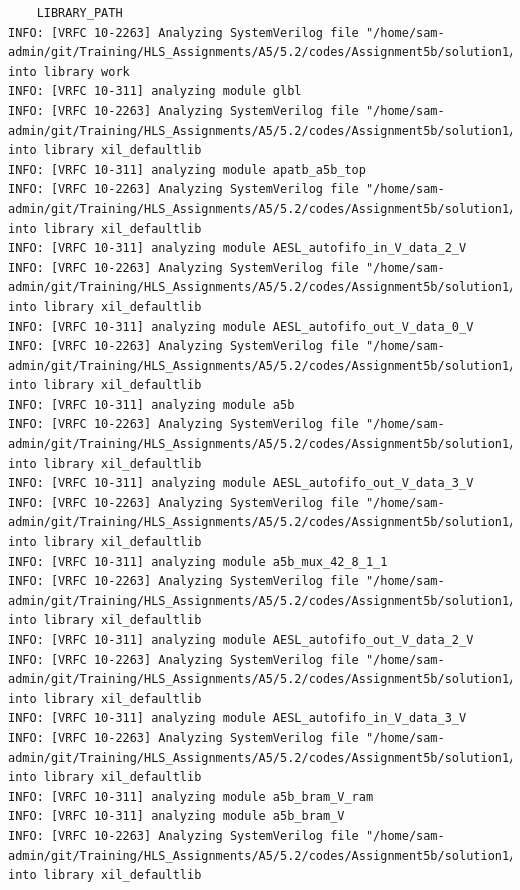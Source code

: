 \documentclass{article}
\begin{document}
\begin{lstlisting}
    LIBRARY_PATH
INFO: [VRFC 10-2263] Analyzing SystemVerilog file "/home/sam-admin/git/Training/HLS_Assignments/A5/5.2/codes/Assignment5b/solution1/sim/verilog/glbl.v" into library work
INFO: [VRFC 10-311] analyzing module glbl
INFO: [VRFC 10-2263] Analyzing SystemVerilog file "/home/sam-admin/git/Training/HLS_Assignments/A5/5.2/codes/Assignment5b/solution1/sim/verilog/a5b.autotb.v" into library xil_defaultlib
INFO: [VRFC 10-311] analyzing module apatb_a5b_top
INFO: [VRFC 10-2263] Analyzing SystemVerilog file "/home/sam-admin/git/Training/HLS_Assignments/A5/5.2/codes/Assignment5b/solution1/sim/verilog/AESL_autofifo_in_V_data_2_V.v" into library xil_defaultlib
INFO: [VRFC 10-311] analyzing module AESL_autofifo_in_V_data_2_V
INFO: [VRFC 10-2263] Analyzing SystemVerilog file "/home/sam-admin/git/Training/HLS_Assignments/A5/5.2/codes/Assignment5b/solution1/sim/verilog/AESL_autofifo_out_V_data_0_V.v" into library xil_defaultlib
INFO: [VRFC 10-311] analyzing module AESL_autofifo_out_V_data_0_V
INFO: [VRFC 10-2263] Analyzing SystemVerilog file "/home/sam-admin/git/Training/HLS_Assignments/A5/5.2/codes/Assignment5b/solution1/sim/verilog/a5b.v" into library xil_defaultlib
INFO: [VRFC 10-311] analyzing module a5b
INFO: [VRFC 10-2263] Analyzing SystemVerilog file "/home/sam-admin/git/Training/HLS_Assignments/A5/5.2/codes/Assignment5b/solution1/sim/verilog/AESL_autofifo_out_V_data_3_V.v" into library xil_defaultlib
INFO: [VRFC 10-311] analyzing module AESL_autofifo_out_V_data_3_V
INFO: [VRFC 10-2263] Analyzing SystemVerilog file "/home/sam-admin/git/Training/HLS_Assignments/A5/5.2/codes/Assignment5b/solution1/sim/verilog/a5b_mux_42_8_1_1.v" into library xil_defaultlib
INFO: [VRFC 10-311] analyzing module a5b_mux_42_8_1_1
INFO: [VRFC 10-2263] Analyzing SystemVerilog file "/home/sam-admin/git/Training/HLS_Assignments/A5/5.2/codes/Assignment5b/solution1/sim/verilog/AESL_autofifo_out_V_data_2_V.v" into library xil_defaultlib
INFO: [VRFC 10-311] analyzing module AESL_autofifo_out_V_data_2_V
INFO: [VRFC 10-2263] Analyzing SystemVerilog file "/home/sam-admin/git/Training/HLS_Assignments/A5/5.2/codes/Assignment5b/solution1/sim/verilog/AESL_autofifo_in_V_data_3_V.v" into library xil_defaultlib
INFO: [VRFC 10-311] analyzing module AESL_autofifo_in_V_data_3_V
INFO: [VRFC 10-2263] Analyzing SystemVerilog file "/home/sam-admin/git/Training/HLS_Assignments/A5/5.2/codes/Assignment5b/solution1/sim/verilog/a5b_bram_V.v" into library xil_defaultlib
INFO: [VRFC 10-311] analyzing module a5b_bram_V_ram
INFO: [VRFC 10-311] analyzing module a5b_bram_V
INFO: [VRFC 10-2263] Analyzing SystemVerilog file "/home/sam-admin/git/Training/HLS_Assignments/A5/5.2/codes/Assignment5b/solution1/sim/verilog/AESL_autofifo_in_V_data_1_V.v" into library xil_defaultlib

\end{lstlisting}
\end{document}
